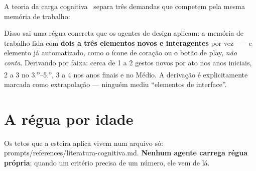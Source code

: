 \documentclass[11pt,a4paper]{article}
\newcommand{\cod}[1]{{\ttfamily\small #1}}
\begin{document}
A teoria da carga cognitiva~\cite{sweller1988,sweller2019} separa três demandas que competem pela mesma memória de trabalho:

\begin{center}
\end{center}

Disso sai uma régua concreta que os agentes de design aplicam: a memória de trabalho lida com \textbf{dois a três elementos novos e interagentes} por vez~\cite{sweller2019} --- e elemento já automatizado, como o ícone de coração ou o botão de play, \emph{não conta}. Derivando por faixa: cerca de 1 a 2 gestos novos por ato nos anos iniciais, 2 a 3 no 3.\textsuperscript{o}--5.\textsuperscript{o}, 3 a 4 nos anos finais e no Médio. A derivação é explicitamente marcada como extrapolação --- ninguém mediu ``elementos de interface''.

\section{A régua por idade}
\label{sec:regua}

Os tetos que a esteira aplica vivem num arquivo só: \cod{prompts/references/literatura-cognitiva.md}. \textbf{Nenhum agente carrega régua própria}; quando um critério precisa de um número, ele vem de lá.
\end{document}
